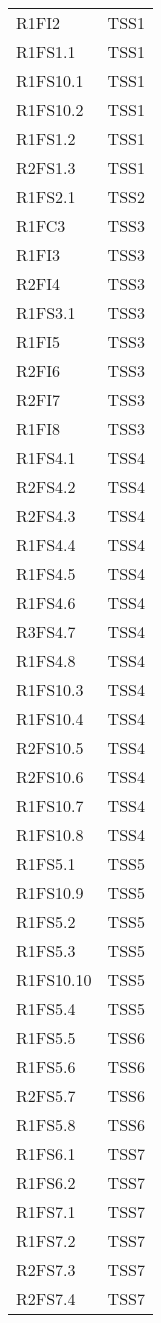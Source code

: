{\begin{longtable}{C{4cm} C{4cm}}
R1FI2 & TSS1\\
R1FS1.1 & TSS1 \\
R1FS10.1 & TSS1 \\
R1FS10.2 & TSS1 \\
R1FS1.2 & TSS1 \\
R2FS1.3 & TSS1 \\
R1FS2.1 & TSS2 \\
R1FC3 & TSS3 \\
R1FI3 & TSS3 \\
R2FI4 & TSS3 \\
R1FS3.1 & TSS3 \\
R1FI5 & TSS3 \\
R2FI6 & TSS3 \\
R2FI7 & TSS3 \\
R1FI8 & TSS3 \\
R1FS4.1 & TSS4 \\
R2FS4.2 & TSS4 \\
R2FS4.3 & TSS4 \\
R1FS4.4 & TSS4 \\
R1FS4.5 & TSS4 \\
R1FS4.6 & TSS4 \\
R3FS4.7 & TSS4 \\
R1FS4.8 & TSS4 \\
R1FS10.3 & TSS4 \\
R1FS10.4 & TSS4 \\
R2FS10.5 & TSS4 \\
R2FS10.6 & TSS4 \\
R1FS10.7 & TSS4 \\
R1FS10.8 & TSS4 \\
R1FS5.1 & TSS5 \\
R1FS10.9 & TSS5 \\
R1FS5.2 & TSS5 \\
R1FS5.3 & TSS5 \\
R1FS10.10 & TSS5 \\
R1FS5.4 & TSS5 \\
R1FS5.5 & TSS6 \\
R1FS5.6 & TSS6 \\
R2FS5.7 & TSS6 \\
R1FS5.8 & TSS6 \\
R1FS6.1 & TSS7 \\
R1FS6.2 & TSS7 \\
R1FS7.1 & TSS7 \\
R1FS7.2 & TSS7 \\
R2FS7.3 & TSS7 \\
R2FS7.4 & TSS7 \\

\end{longtable}}
